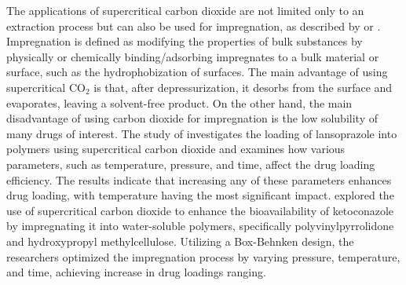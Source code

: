 \documentclass[a4paper,fleqn]{cas-dc}
\begin{document}
	The applications of supercritical carbon dioxide are not limited only to an extraction process but can also be used for impregnation, as described by \citet{Weidner2018} or \citet{Machado2022}. Impregnation is defined as modifying the properties of bulk substances by physically or chemically binding/adsorbing impregnates to a bulk material or surface, such as the hydrophobization of surfaces. The main advantage of using supercritical CO$_2$ is that, after depressurization, it desorbs from the surface and evaporates, leaving a solvent-free product. On the other hand, the main disadvantage of using carbon dioxide for impregnation is the low solubility of many drugs of interest.
	The study of \citet{Ameri2020} investigates the loading of lansoprazole into polymers using supercritical carbon dioxide and examines how various parameters, such as temperature, pressure, and time, affect the drug loading efficiency. The results indicate that increasing any of these parameters enhances drug loading, with temperature having the most significant impact. \citet{Fathi2022} explored the use of supercritical carbon dioxide to enhance the bioavailability of ketoconazole by impregnating it into water-soluble polymers, specifically polyvinylpyrrolidone and hydroxypropyl methylcellulose. Utilizing a Box-Behnken design, the researchers optimized the impregnation process by varying pressure, temperature, and time, achieving increase in drug loadings ranging.
	
\end{document}
